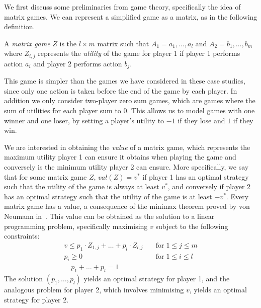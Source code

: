We first discuss some preliminaries from game theory, specifically the idea of matrix games. We can represent a simplified game as a matrix, as in the following definition.

\begin{definition}
    \label{cs3:matrix_games}

    A \emph{matrix game} $Z$ is the $l \times m$ matrix such that $A_1 = {a_1, \dots, a_l}$ and  $A_2 = {b_1, \dots, b_m}$ where $Z_{i, j}$ represents the \emph{utility} of the game for player 1 if player 1 performs action $a_i$ and player 2 performs action $b_j$.
\end{definition}

This game is simpler than the games we have considered in these case studies, since only one action is taken before the end of the game by each player. In addition we only consider two-player zero sum games, which are games where the sum of utilities for each player sum to 0. This allows us to model games with one winner and one loser, by setting a player's utility to $-1$ if they lose and $1$ if they win.


We are interested in obtaining the \emph{value} of a matrix game, which represents the maximum utility player 1 can ensure it obtains when playing the game and conversely is the minimum utility player 2 can ensure. More specifically, we say that for some matrix game $Z$, $val(Z) = v^*$ if player 1 has an optimal strategy such that the utility of the game is always at least $v^*$, and conversely if player 2 has an optimal strategy such that the utility of the game is at least $-v^*$. Every matrix game has a value, a consequence of the minimax theorem proved by von Neumann in~\cite{v_neumann_zur_1928}. This value can be obtained as the solution to a linear programming problem, specifically maximising $v$ subject to the following constraints:
\begin{align*}
v \leq p_1 \cdot Z_{1, j} + \dots + p_l \cdot Z_{l, j} & \quad \text{for} \; 1 \leq j \leq m \\
p_i \geq 0 & \quad \text{for} \; 1 \leq i \leq l \\ \quad p_1 + \dots + p_l = 1
\end{align*}
The solution $(p_1, \dots, p_l)$ yields an optimal strategy for player 1, and the analogous problem for player 2, which involves minimising $v$, yields an optimal strategy for player 2.

